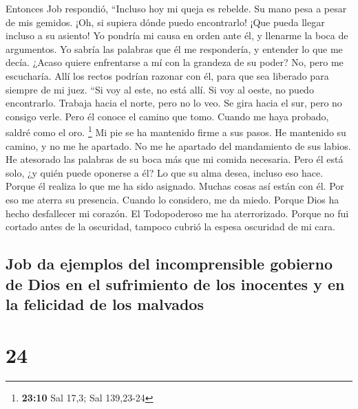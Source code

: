  Entonces Job respondió,  ``Incluso hoy mi
queja es rebelde. Su mano pesa a pesar de mis gemidos. 
¡Oh, si supiera dónde puedo encontrarlo! ¡Que pueda llegar incluso a su
asiento!  Yo pondría mi causa en orden ante él, y llenarme
la boca de argumentos.  Yo sabría las palabras que él me
respondería, y entender lo que me decía.  ¿Acaso quiere
enfrentarse a mí con la grandeza de su poder? No, pero me escucharía.
 Allí los rectos podrían razonar con él, para que sea
liberado para siempre de mi juez.  ``Si voy al este, no
está allí. Si voy al oeste, no puedo encontrarlo.  Trabaja
hacia el norte, pero no lo veo. Se gira hacia el sur, pero no consigo
verle.  Pero él conoce el camino que tomo. Cuando me haya
probado, saldré como el oro. \footnote{\textbf{23:10} Sal 17,3; Sal
  139,23-24}  Mi pie se ha mantenido firme a sus pasos.
He mantenido su camino, y no me he apartado.  No me he
apartado del mandamiento de sus labios. He atesorado las palabras de su
boca más que mi comida necesaria.  Pero él está solo, ¿y
quién puede oponerse a él? Lo que su alma desea, incluso eso hace.
 Porque él realiza lo que me ha sido asignado. Muchas
cosas así están con él.  Por eso me aterra su presencia.
Cuando lo considero, me da miedo.  Porque Dios ha hecho
desfallecer mi corazón. El Todopoderoso me ha aterrorizado.
 Porque no fui cortado antes de la oscuridad, tampoco
cubrió la espesa oscuridad de mi cara.

\hypertarget{job-da-ejemplos-del-incomprensible-gobierno-de-dios-en-el-sufrimiento-de-los-inocentes-y-en-la-felicidad-de-los-malvados}{%
\subsection{Job da ejemplos del incomprensible gobierno de Dios en el
sufrimiento de los inocentes y en la felicidad de los
malvados}\label{job-da-ejemplos-del-incomprensible-gobierno-de-dios-en-el-sufrimiento-de-los-inocentes-y-en-la-felicidad-de-los-malvados}}

\hypertarget{section-23}{%
\section{24}\label{section-23}}

